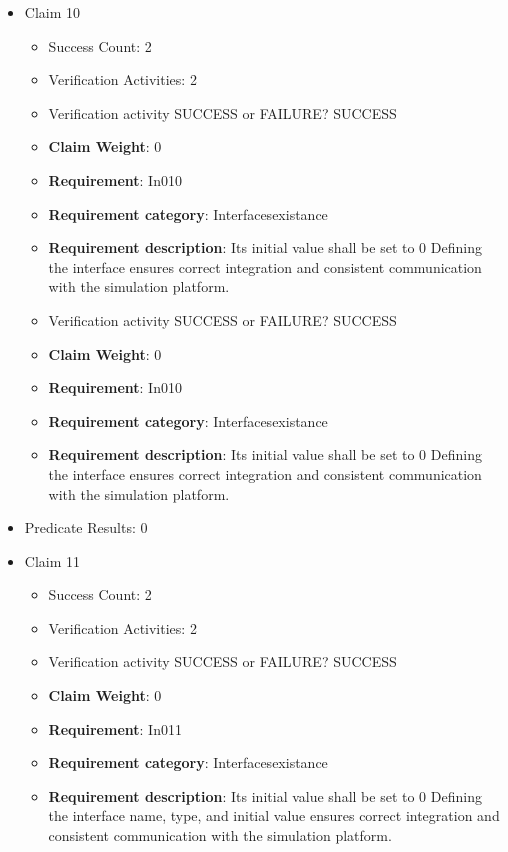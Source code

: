 \documentclass{article}
\begin{document}
\begin{itemize}
  				  \item Claim 10
				\begin{itemize}
			    	\item Success Count: 2 
			    	\item Verification Activities: 2
					\item Verification activity SUCCESS or FAILURE? SUCCESS
					\item \textbf{Claim Weight}: 0
						\item \textbf{Requirement}: In010 
						\item \textbf{Requirement category}: Interfacesexistance 
						\item \textbf{Requirement description}: Its initial value shall be set to 0 Defining the interface ensures correct integration and consistent communication with the simulation platform.
					
					\item Verification activity SUCCESS or FAILURE? SUCCESS
					\item \textbf{Claim Weight}: 0
						\item \textbf{Requirement}: In010 
						\item \textbf{Requirement category}: Interfacesexistance 
						\item \textbf{Requirement description}: Its initial value shall be set to 0 Defining the interface ensures correct integration and consistent communication with the simulation platform.
					
				\end{itemize}
				
									    
				\item Predicate Results: 0

  				  \item Claim 11
				\begin{itemize}
			    	\item Success Count: 2 
			    	\item Verification Activities: 2
					\item Verification activity SUCCESS or FAILURE? SUCCESS
					\item \textbf{Claim Weight}: 0
						\item \textbf{Requirement}: In011 
						\item \textbf{Requirement category}: Interfacesexistance 
						\item \textbf{Requirement description}: Its initial value shall be set to 0 Defining the interface name, type, and initial value ensures correct integration and consistent communication with the simulation platform.
					

\end{itemize}
\end{itemize}
\end{document}
